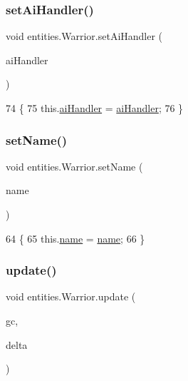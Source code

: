\subsubsection{\texorpdfstring{set\+Ai\+Handler()}{setAiHandler()}}
{\footnotesize\ttfamily void entities.\+Warrior.\+set\+Ai\+Handler (\begin{DoxyParamCaption}\item[{\mbox{\hyperlink{classentities_1_1_a_i_handler_basic}{A\+I\+Handler\+Basic}}}]{ai\+Handler }\end{DoxyParamCaption})\hspace{0.3cm}{\ttfamily [inline]}}


\begin{DoxyCode}
74                                                        \{
75         this.\mbox{\hyperlink{classentities_1_1_warrior_a5192a845694a855efc603e4e89d6df38}{aiHandler}} = \mbox{\hyperlink{classentities_1_1_warrior_a5192a845694a855efc603e4e89d6df38}{aiHandler}};
76     \}
\end{DoxyCode}
\mbox{\label{classentities_1_1_warrior_a54b1c7f1fe10f56a7d79bdb2ca5bac47}} 
\subsubsection{\texorpdfstring{set\+Name()}{setName()}}
{\footnotesize\ttfamily void entities.\+Warrior.\+set\+Name (\begin{DoxyParamCaption}\item[{String}]{name }\end{DoxyParamCaption})\hspace{0.3cm}{\ttfamily [inline]}}


\begin{DoxyCode}
64                                      \{
65         this.\mbox{\hyperlink{classentities_1_1_warrior_a1fab32d35334023bc7cd4866841e817b}{name}} = \mbox{\hyperlink{classentities_1_1_warrior_a1fab32d35334023bc7cd4866841e817b}{name}};
66     \}
\end{DoxyCode}
\mbox{\label{classentities_1_1_warrior_a2c05623f54a94a3cf0bc7c07f6963a49}} 
\subsubsection{\texorpdfstring{update()}{update()}}
{\footnotesize\ttfamily void entities.\+Warrior.\+update (\begin{DoxyParamCaption}\item[{\mbox{\hyperlink{classorg_1_1newdawn_1_1slick_1_1_game_container}{Game\+Container}}}]{gc,  }\item[{long}]{delta }\end{DoxyParamCaption})\hspace{0.3cm}{\ttfamily [inline]}}


